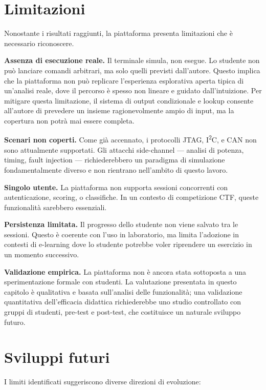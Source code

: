 \section{Limitazioni}
\label{sec:limitazioni}

Nonostante i risultati raggiunti, la piattaforma presenta limitazioni che è necessario riconoscere.

\textbf{Assenza di esecuzione reale.} Il terminale simula, non esegue. Lo studente non può lanciare comandi arbitrari, ma solo quelli previsti dall'autore. Questo implica che la piattaforma non può replicare l'esperienza esplorativa aperta tipica di un'analisi reale, dove il percorso è spesso non lineare e guidato dall'intuizione. Per mitigare questa limitazione, il sistema di output condizionale e lookup consente all'autore di prevedere un insieme ragionevolmente ampio di input, ma la copertura non potrà mai essere completa.

\textbf{Scenari non coperti.} Come già accennato, i protocolli JTAG, I\textsuperscript{2}C, e CAN non sono attualmente supportati. Gli attacchi side-channel --- analisi di potenza, timing, fault injection --- richiederebbero un paradigma di simulazione fondamentalmente diverso e non rientrano nell'ambito di questo lavoro.

\textbf{Singolo utente.} La piattaforma non supporta sessioni concorrenti con autenticazione, scoring, o classifiche. In un contesto di competizione CTF, queste funzionalità sarebbero essenziali.

\textbf{Persistenza limitata.} Il progresso dello studente non viene salvato tra le sessioni. Questo è coerente con l'uso in laboratorio, ma limita l'adozione in contesti di e-learning dove lo studente potrebbe voler riprendere un esercizio in un momento successivo.

\textbf{Validazione empirica.} La piattaforma non è ancora stata sottoposta a una sperimentazione formale con studenti. La valutazione presentata in questo capitolo è qualitativa e basata sull'analisi delle funzionalità; una validazione quantitativa dell'efficacia didattica richiederebbe uno studio controllato con gruppi di studenti, pre-test e post-test, che costituisce un naturale sviluppo futuro.


\section{Sviluppi futuri}
\label{sec:sviluppi-futuri}

I limiti identificati suggeriscono diverse direzioni di evoluzione:

